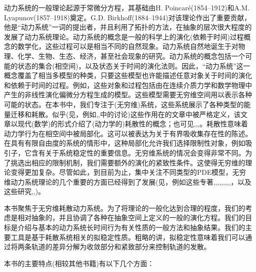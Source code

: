 \begin{introduction}
	动力系统的一般理论起源于常微分方程，其基础由H. Poincaré(1854–1912)和A.M. Lyapunov(1857–1918)奠定。G.D. Birkhoff(1884–1944)对该理论作出了重要贡献，他是“动力系统”一词的提出者，并且利用了拓扑的方法，在抽象的层次很大程度的发展了动力系统理论。动力系统的概念是一般的科学上的演化(依赖于时间)过程概念的数学化，这些过程可以是相当不同的自然现象。动力系统自然地诞生于对物理、化学、生物、生态、经济，甚至社会现象的研究。动力系统的概念包括一个可能的状态的集合(相空间)，以及状态关于时间的演化法则。因此，“动力系统”这一概念覆盖了相当多模型的种类，只要这些模型也许能描述任意对象关于时间的演化和依赖于时间的过程。例如，这些对象和过程包括由在连续介质力学和数学物理中产生的非线性演化偏微分方程生成的模型。这些模型需要无穷维空间用以表示各种可能的状态。在本书中，我们专注于(无穷维)系统，这些系统展示了各种类型的能量迁移和耗散。似乎(见，例如\cite{Hale88},\cite{Raugel02},\cite{Temam97}中的讨论)这些作用在\cite{Levinson45}的文章中被严格定义，该文章以现代(数学)的形式介绍了(动力学的)耗散性的概念；也可见\cite{Billoti71},\cite{Coddington55},\cite{Pliss66},\cite{Pliss77}。耗散性意味着动力学行为在相空间中被局部化。这可以被表达为关于有界吸收集存在性的陈述。在具有有限自由度的系统的情形中，这种局部化允许我们选择限制性对象，例如吸引子，它含有关于系统稳定性的重要信息。无穷维系统的情况会变得非常不同。为了挑选出相应的限制机制，我们需要额外的演化的紧致性条件。这使得无穷维的理论变得更加复杂。尽管如此，到目前为止，集中关注不同类型的PDE模型，无穷维动力系统理论的几个重要的方面已经得到了发展(见，例如这些专著\cite{Babin92},\cite{Chepyzhov02},\cite{Chueshov99},\cite{Chueshov10},\cite{Chueshov08},\cite{Hale88},\cite{Ladyzhenskaya91},\cite{Robinson01},\cite{Sell02},\cite{Temam97}，以及这些研究\cite{Babin06},\cite{Miranville08},\cite{Raugel02})。
	
	本书聚焦于无穷维耗散动力系统。为了将理论的一般化达到合理的程度，我们的考虑是相对抽象的，并且协调了各种在抽象空间上定义的一般的演化方程。我们的目标是介绍与基本的动力系统长时间行为有关性质的一般方法和抽象结果。我们的主要工具是基于耗散系统相关的拟稳定性质。粗略的讲，拟稳定性意味着我们可以通过将两条轨道的差异分解为收敛部分和紧致部分来控制轨道的发散。
	
	本书的主要特点(相较其他书籍)有以下几个方面：
\end{introduction}